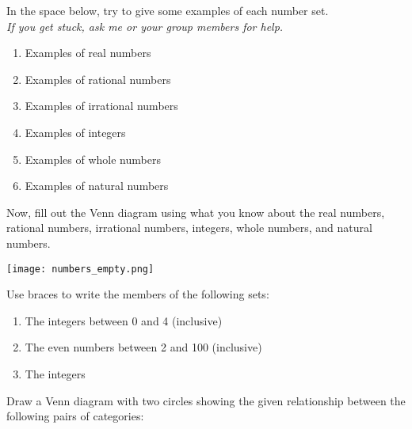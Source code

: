 \documentclass[12pt]{article}
\begin{document}
\pagebreak


In the space below, try to give some examples of each number set. \\
\emph{If you get stuck, ask me or your group members for help.}

\begin{enumerate}
	\item Examples of real numbers
	\vskip 30pt
	\item Examples of rational numbers
	\vskip 30pt
	\item Examples of irrational numbers
	\vskip 30pt
	\item Examples of integers
	\vskip 30pt
	\item Examples of whole numbers
	\vskip 30pt
	\item Examples of natural numbers
	\vskip 30pt
\end{enumerate}


\pagebreak
Now, fill out the Venn diagram using what you know about the real numbers, rational numbers, irrational numbers, integers, whole numbers, and natural numbers.

\vskip 30pt

\texttt{[image: numbers\_empty.png]}

\pagebreak
Use braces to write the members of the following sets: \\

\begin{enumerate}
	\item The integers between 0 and 4 (inclusive)
	\vskip 30pt
	\item The even numbers between 2 and 100  (inclusive)
	\vskip 30pt
	\item The integers
	\vskip 30pt
\end{enumerate}

\vspace{0.5in}
Draw a Venn diagram with two circles showing the given relationship between the following pairs of categories: \\
\end{document}
